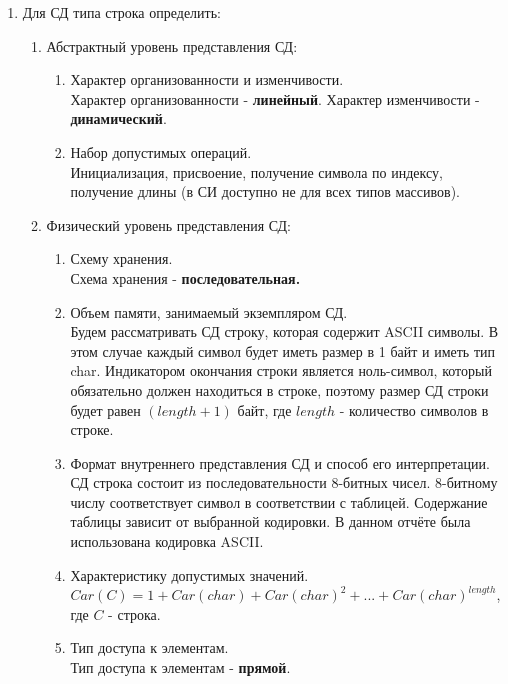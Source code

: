 \documentclass[a4paper,14pt]{extarticle}
\begin{document}
\begin{enumerate}
	\item Для СД типа строка определить:
	      \begin{enumerate}[label*=\arabic*.]
		      \item Абстрактный уровень представления СД:

		            \begin{enumerate}[label*=\arabic*.]
			            \item Характер организованности и изменчивости.\\
			            Характер организованности - \textbf{линейный}. Характер изменчивости - \textbf{динамический}.
			            \item Набор допустимых операций.\\
			            Инициализация, присвоение, получение символа по индексу, получение длины (в СИ доступно не для всех типов массивов).
		            \end{enumerate}

		      \item Физический уровень представления СД:

		            \begin{enumerate}[label*=\arabic*.]
			            \item Схему хранения.\\
			            Схема хранения - \textbf{последовательная.}
			            \item Объем памяти, занимаемый экземпляром СД.\\
			            Будем рассматривать СД строку, которая содержит ASCII символы. 
						В этом случае каждый символ будет иметь размер в 1 байт и иметь тип char. 
						Индикатором окончания строки является ноль-символ, который обязательно
						должен находиться в строке, поэтому размер СД строки будет равен
						$(length + 1)$ байт, где $length$ - количество символов в строке.
			            \item Формат внутреннего представления СД и способ его интерпретации.\\
			            СД строка состоит из последовательности 8-битных чисел.
						8-битному числу соответствует символ в соответствии с таблицей. 
						Содержание таблицы зависит от выбранной кодировки. 
						В данном отчёте была использована кодировка ASCII.
			            \item Характеристику допустимых значений.\\
			            $Car(C) = 1 + Car(char) + Car(char) ^ 2 + ... + Car(char) ^ {length}$, где $C$ - строка.
			            \item Тип доступа к элементам.\\
						Тип доступа к элементам - \textbf{прямой}.
		            \end{enumerate}


\end{enumerate}
\end{enumerate}
\end{document}
